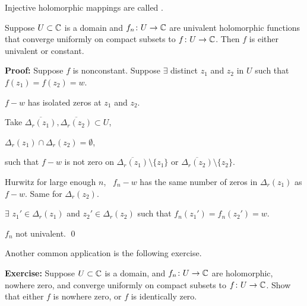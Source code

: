 \documentclass[10pt,aspectratio=169]{beamer}
\begin{document}
\begin{frame}
Injective holomorphic
mappings are called \emph{}.

\pause

\begin{corollary}
Suppose $U \subset {\mathbb{C}}$ is a domain and $f_n \colon U \to {\mathbb{C}}$ are
univalent holomorphic functions that converge uniformly on compact subsets
to $f \colon U \to {\mathbb{C}}$.  Then $f$ is either univalent or constant.
\end{corollary}

\pause
\textbf{Proof:}
Suppose $f$ is nonconstant.
\pause
Suppose $\exists$ distinct $z_1$ and $z_2$ in $U$ such that $f(z_1) =
f(z_2) = w$.

\pause
\medskip

$f-w$ has isolated zeros at $z_1$ and $z_2$.

\medskip
\pause
Take $\overline{\Delta_r(z_1)},\overline{\Delta_r(z_2)} \subset U$,

\pause
$\Delta_r(z_1) \cap \Delta_r(z_2) = \emptyset$,

\pause 
such that $f-w$ is not zero on
$\overline{\Delta_r(z_1)} \setminus \{ z_1 \}$ or
$\overline{\Delta_r(z_2)} \setminus \{ z_2 \}$.

\medskip
\pause

Hurwitz \wthus for large enough $n$, ~$f_n-w$ has the same number of
zeros in $\Delta_r(z_1)$ as $f-w$. \pause Same for $\Delta_r(z_2)$.

\pause
\medskip
\thus \quad $\exists$ $z_1' \in \Delta_r(z_1)$ and
$z_2' \in \Delta_r(z_2)$ such that $f_n(z_1')=f_n(z_2')=w$.

\pause
\medskip

\thus \quad
$f_n$ not univalent. \qed
\end{frame}

\begin{frame}
Another common application is the following exercise.

\medskip
\pause

\textbf{Exercise:}
Suppose $U \subset {\mathbb{C}}$ is a domain,
and
$f_n \colon U \to {\mathbb{C}}$ are holomorphic, nowhere zero,
and converge uniformly on compact subsets to $f \colon U \to {\mathbb{C}}$.
\pause
Show that either $f$ is nowhere zero, or $f$ is identically zero.
\end{frame}
\end{document}
